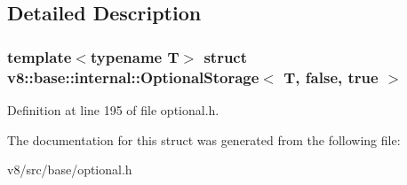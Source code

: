 \subsection{Detailed Description}
\subsubsection*{template$<$typename T$>$\newline
struct v8\+::base\+::internal\+::\+Optional\+Storage$<$ T, false, true $>$}



Definition at line 195 of file optional.\+h.



The documentation for this struct was generated from the following file\+:\begin{DoxyCompactItemize}
\item 
v8/src/base/optional.\+h\end{DoxyCompactItemize}
